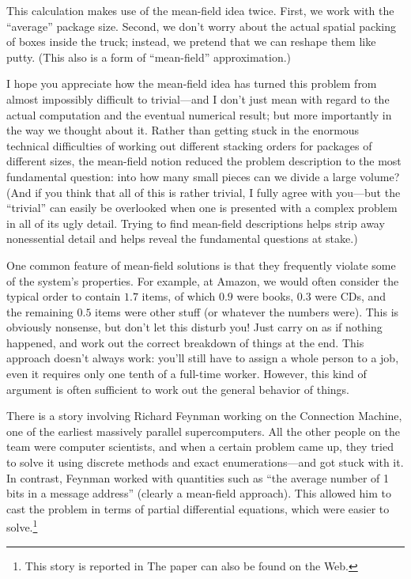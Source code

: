 This calculation makes use of the mean-field idea twice. First, we
work with the ``average'' package size. Second, we don't worry about
the actual spatial packing of boxes inside the truck; instead, we
pretend that we can reshape them like putty. (This also is a form of
``mean-field'' approximation.)

I hope you appreciate how the mean-field idea has turned this problem
from almost impossibly difficult to trivial---and I don't just mean
with regard to the actual computation and the eventual numerical
result; but more importantly in the way we thought about it.  Rather
than getting stuck in the enormous technical difficulties of working
out different stacking orders for packages of different sizes, the
mean-field notion reduced the problem description to the most
fundamental question: into how many small pieces can we divide a large
volume? (And if you think that all of this is rather trivial, I fully
agree with you---but the ``trivial'' can easily be overlooked when one
is presented with a complex problem in all of its ugly detail. Trying
to find mean-field descriptions helps strip away nonessential detail
and helps reveal the fundamental questions at stake.)

One common feature of mean-field solutions is that they frequently
violate some of the system's properties. For example, at Amazon, we
would often consider the typical order to contain $1.7$ items, of
which $0.9$ were books, $0.3$ were CDs, and the remaining $0.5$ items
were other stuff (or whatever the numbers were). This is obviously
nonsense, but don't let this disturb you!  Just carry on as if nothing
happened, and work out the correct breakdown of things at the end.
This approach doesn't always work: you'll still have to assign a whole
person to a job, even it requires only one tenth of a full-time
worker.  However, this kind of argument is often sufficient to work
out the general behavior of things.

There is a story involving Richard Feynman working on the Connection
Machine, one of the earliest massively parallel supercomputers.  All
the other people on the team were\vadjust{\pagebreak} computer scientists, and when a
certain problem came up, they tried to solve it using discrete methods
and exact enumerations---and got stuck with it. In contrast, Feynman
worked with quantities such as ``the average number of 1 bits in a
message address'' (clearly a mean-field approach). This allowed him to
cast the problem in terms of partial differential equations, which
were easier to solve.\footnote{This story is reported in
   The paper can also
  be found on the Web.}

